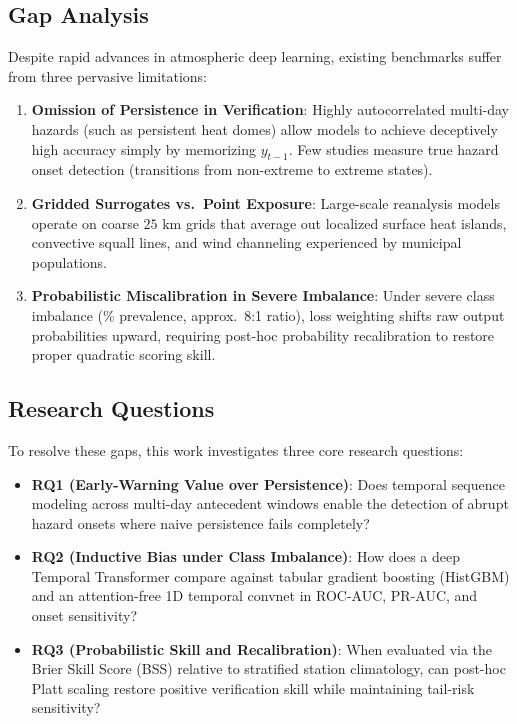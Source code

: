 \documentclass[conference]{IEEEtran}
\begin{document}
\subsection{Gap Analysis}
\label{sec:gap_analysis}
Despite rapid advances in atmospheric deep learning, existing benchmarks suffer from three pervasive limitations:
\begin{enumerate}
    \item \textbf{Omission of Persistence in Verification}: Highly autocorrelated multi-day hazards (such as persistent heat domes) allow models to achieve deceptively high accuracy simply by memorizing $y_{t-1}$. Few studies measure true hazard onset detection (transitions from non-extreme to extreme states).
    \item \textbf{Gridded Surrogates vs.\ Point Exposure}: Large-scale reanalysis models operate on coarse $25\text{ km}$ grids that average out localized surface heat islands, convective squall lines, and wind channeling experienced by municipal populations.
    \item \textbf{Probabilistic Miscalibration in Severe Imbalance}: Under severe class imbalance (\prevalenceRate{}\% prevalence, approx.\ 8:1 ratio), loss weighting shifts raw output probabilities upward, requiring post-hoc probability recalibration to restore proper quadratic scoring skill.
\end{enumerate}

\subsection{Research Questions}
\label{sec:rqs}
To resolve these gaps, this work investigates three core research questions:
\begin{itemize}
    \item \textbf{RQ1 (Early-Warning Value over Persistence)}: Does temporal sequence modeling across multi-day antecedent windows enable the detection of abrupt hazard onsets where naive persistence fails completely?
    \item \textbf{RQ2 (Inductive Bias under Class Imbalance)}: How does a deep Temporal Transformer compare against tabular gradient boosting (HistGBM) and an attention-free 1D temporal convnet in ROC-AUC, PR-AUC, and onset sensitivity?
    \item \textbf{RQ3 (Probabilistic Skill and Recalibration)}: When evaluated via the Brier Skill Score (BSS) relative to stratified station climatology, can post-hoc Platt scaling restore positive verification skill while maintaining tail-risk sensitivity?
\end{itemize}
\end{document}
